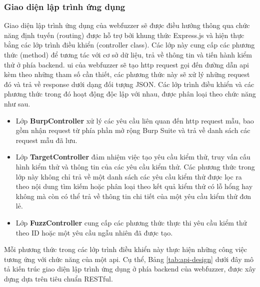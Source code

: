 \subsubsection{Giao diện lập trình ứng dụng}
Giao diện lập trình ứng dụng của webfuzzer sẽ được điều hướng thông qua chức năng định tuyến (routing) được hỗ trợ bởi khung thức Express.js và hiện thực bằng các lớp trình điều khiển (controller class). Các lớp này cung cấp các phương thức (method) để tương tác với cơ sở dữ liệu, trả về thông tin và tiến hành kiểm thử ở phía backend. \acrshort{ui} của webfuzzer sẽ tạo \acrshort{http} request gọi đến đường dẫn \acrshort{api} kèm theo những tham số cần thiết, các phương thức này sẽ xử lý những request đó và trả về response dưới dạng đối tượng JSON. Các lớp trình điều khiển và các phương thức trong đó hoạt động độc lập với nhau, được phân loại theo chức năng như sau.
\begin{itemize}
    \item Lớp \textbf{BurpController} xử lý các yêu cầu liên quan đến \acrshort{http} request mẫu, bao gồm nhận request từ phía phần mở rộng Burp Suite và trả về danh sách các request mẫu đã lưu.
    \item Lớp \textbf{TargetController} đảm nhiệm việc tạo yêu cầu kiểm thử, truy vấn cấu hình kiểm thử và thông tin của các yêu cầu kiểm thử. Các phương thức trong lớp này không chỉ trả về một danh sách các yêu cầu kiểm thử được lọc ra theo nội dung tìm kiếm hoặc phân loại theo kết quả kiểm thử có lỗ hổng hay không mà còn có thể trả về thông tin chi tiết của một yêu cầu kiểm thử đơn lẻ.
    \item Lớp \textbf{FuzzController} cung cấp các phương thức thực thi yêu cầu kiểm thử theo ID hoặc một yêu cầu ngẫu nhiên đã được tạo.
\end{itemize}
Mỗi phương thức trong các lớp trình điều khiển này thực hiện những công việc tương ứng với chức năng của một \acrshort{api}. Cụ thể, Bảng \ref{tab:api-design} dưới đây mô tả kiến trúc giao diện lập trình ứng dụng ở phía backend của webfuzzer, được xây dựng dựa trên tiêu chuẩn RESTful.
\FloatBarrier
